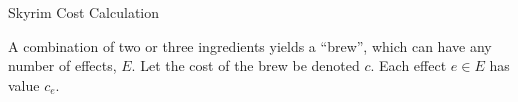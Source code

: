 \documentclass[12pt]{article}
\begin{document}
{\Huge Skyrim Cost Calculation}

A combination of two or three ingredients yields a ``brew'', which can have any number of effects, $E$. Let the cost of the brew be denoted $c$. Each effect $e \in E$ has value $c_e$.
\end{document}

